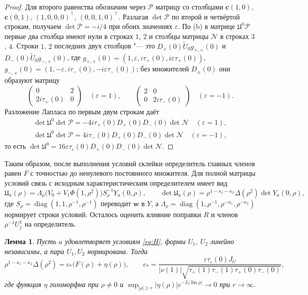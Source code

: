 \documentclass[12pt,a4paper]{article}
\numberwithin{equation}{section}
\newtheorem{lemma}{Лемма}
\theoremstyle{definition}
\newcommand{\abs}[1]{\lvert#1\rvert}
\newcommand{\Imm}{\operatorname{Im}}
\newcommand{\Uf}{\mathfrak U}
\newcommand{\Mm}{\mathcal N}
\begin{document}
\begin{proof}
Для второго равенства обозначим через $\mathcal P$ матрицу со столбцами $\mathbf c(1,0)$,
$\mathbf c(0,1)$, $(1,0,0,0)^\top$, $(0,0,1,0)^\top$.
Разлагая $\det\mathcal P$ по второй и четвёртой строкам, получаем
$\det\mathcal P=-i/4$ при обоих значениях $\varepsilon$. По (b) в матрице
$\Uf^0\mathcal P$ первые два столбца имеют нули в строках $1$, $2$ и столбцы матрицы $\Mm$ в
строках $3$, $4$. Строки $1$, $2$ последних двух столбцов "--- это $D_+(0)\widetilde U_0g_{+,+}(0)$
и $D_-(0)\widetilde U_0g_{-,+}(0)$, где $g_{+,+}(0)=(1,\varepsilon,i\tau_+(0),i\varepsilon\tau_+(0))$,
$g_{-,+}(0)=(1,-\varepsilon,i\tau_-(0),-i\varepsilon\tau_-(0))$; без множителей $D_\pm(0)$ они
образуют матрицу
\[
 \begin{pmatrix}0&2\\2i\tau_+(0)&0\end{pmatrix}\quad(\varepsilon=1),\qquad
 \begin{pmatrix}2&0\\0&2i\tau_-(0)\end{pmatrix}\quad(\varepsilon=-1).
\]
Разложение Лапласа по первым двум строкам даёт
\begin{gather*}
 \det\Uf^0\det\mathcal P=-4i\tau_+(0)D_+(0)D_-(0)\det\Mm\quad(\varepsilon=1),\\
 \det\Uf^0\det\mathcal P=4i\tau_-(0)D_+(0)D_-(0)\det\Mm\quad(\varepsilon=-1),
\end{gather*}
то есть $\det\Uf^0=16\varepsilon\tau_\varepsilon(0)D_+(0)D_-(0)\det\Mm$.
\end{proof}

Таким образом, после выполнения условий склейки определитель главных членов
равен $F$ с точностью до ненулевого постоянного множителя. Для полной матрицы
условий связь с исходным характеристическим определителем имеет вид
\begin{equation}\label{eq:detU}
 \Uf_a(\rho)=\Lambda_\rho\bigl(V_0+V_1\Phi(1,\rho^2)\bigr)S_\rho^{-1}Y_a(0,\rho),\qquad
 \det\Uf_a(\rho)=\rho^{1-\kappa_1-\kappa_2}\Delta(\rho^2)\det Y_a(0,\rho),
\end{equation}
где $S_\rho=\operatorname{diag}(1,1,\rho^{-1},\rho^{-1})$ переводит
$\mathbf w$ в $Y$, а
$\Lambda_\rho=\operatorname{diag}(1,\rho^{-1},\rho^{-\kappa_1},\rho^{-\kappa_2})$
нормирует строки условий. Осталось оценить влияние поправки $R$ и членов
$\rho^{-1}U_j^1$ на определитель.

\begin{lemma}\label{lem:det}
Пусть $a$ удовлетворяет условиям \eqref{eq:H}, формы $U_1$, $U_2$ линейно независимы,
а пара $U_1,U_2$ нормирована. Тогда
\begin{equation}\label{eq:main}
 \rho^{1-\kappa_1-\kappa_2}\Delta(\rho^2)=c_\ast\bigl(F(\rho)+\eta(\rho)\bigr),\qquad
 c_\ast=\frac{\varepsilon\tau_\varepsilon(0)J_U}
 {\abs{\nu(1)}\sqrt{\tau_+(1)\tau_-(1)\tau_+(0)\tau_-(0)}},
\end{equation}
где функция $\eta$ голоморфна при $\rho\ne0$ и
$\sup_{\abs\rho\ge r}\abs{\eta(\rho)}e^{-L\abs{\Imm\rho}}\to0$ при $r\to\infty$.
\end{lemma}
\end{document}
